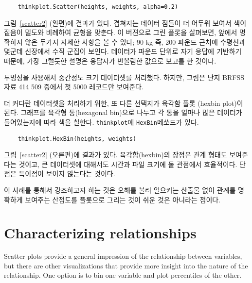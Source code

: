%
\begin{verbatim}
    thinkplot.Scatter(heights, weights, alpha=0.2)
\end{verbatim}
%

그림~\ref{scatter2} (왼편)에 결과가 있다.
겹쳐지는 데이터 점들이 더 어두워 보여서 색이 짙음이 밀도와 비례하여 균형을 맞춘다. 이 버젼으로 그린 플롯을 살펴보면, 앞에서 명확하지 않은 두가지 자세한 사항을 볼 수 있다; 90 kg 즉, 200 파운드 근처에 수평선과 몇군데 신장에서 수직 군집이 보인다. 데이터가 파운드 단위로 자기 응답에 기반하기 때문에, 가장 그럴듯한 설명은 응답자가 반올림한 값으로 보고를 한 것이다.


투명성을 사용해서 중간정도 크기 데이터셋를 처리했다.
하지만, 그림은 단지 BRFSS 자료 414 509 중에서 첫 5000 레코드만 보여준다.


더 커다란 데이터셋을 처리하기 위한,
또 다른 선택지가 육각함 플롯 (hexbin plot)이 된다.
그래프를 육각형 통(hexagonal bin)으로 나누고 각 통을 얼마나 많은 데이터가 들어있는지에 따라 색을 칠한다. {\tt thinkplot}에 {\tt HexBin}메쏘드가 있다.
%
\begin{verbatim}
    thinkplot.HexBin(heights, weights)
\end{verbatim}
%

그림~\ref{scatter2} (오른편)에 결과가 있다.
육각함(hexbin)의 장점은 관계 형태도 보여준다는 것이고,
큰 데이터셋에 대해서도 시간과 파일 크기에 둘 관점에서 효율적이다.
단점은 특이점이 보이지 않는다는 것이다.
 

이 사례를 통해서 강조하고자 하는 것은 오해를 불러 일으키는 산출물 없이 관계를 명확하게 보여주는 산점도를 플롯으로 그리는 것이 쉬운 것은 아니라는 점이다.



\section{Characterizing relationships}
\label{characterizing}

Scatter plots provide a general impression of the relationship between
variables, but there are other visualizations that provide more
insight into the nature of the relationship.  One option is to bin one
variable and plot percentiles of the other.

